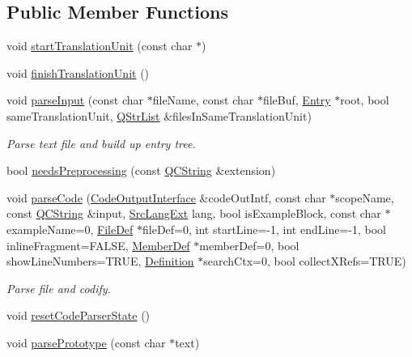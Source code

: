 \subsection*{Public Member Functions}
\begin{DoxyCompactItemize}
\item 
void \mbox{\hyperlink{class_tcl_language_scanner_a60ddc698e1b483f71f4ce4ca4bffb512}{start\+Translation\+Unit}} (const char $\ast$)
\item 
void \mbox{\hyperlink{class_tcl_language_scanner_a187804b0bf0a0043bad0f1a752224909}{finish\+Translation\+Unit}} ()
\item 
\mbox{\label{class_tcl_language_scanner_a0c1673d0753d4fa415de90aa7d875e0e}} 
void \mbox{\hyperlink{class_tcl_language_scanner_a0c1673d0753d4fa415de90aa7d875e0e}{parse\+Input}} (const char $\ast$file\+Name, const char $\ast$file\+Buf, \mbox{\hyperlink{class_entry}{Entry}} $\ast$root, bool same\+Translation\+Unit, \mbox{\hyperlink{class_q_str_list}{Q\+Str\+List}} \&files\+In\+Same\+Translation\+Unit)
\begin{DoxyCompactList}\small\item\em Parse text file and build up entry tree. \end{DoxyCompactList}\item 
bool \mbox{\hyperlink{class_tcl_language_scanner_ab3a4ec9c04dbcf8bb75cd1552c774f5e}{needs\+Preprocessing}} (const \mbox{\hyperlink{class_q_c_string}{Q\+C\+String}} \&extension)
\item 
\mbox{\label{class_tcl_language_scanner_a25f39e49124e2201c4a12d7ff1247b30}} 
void \mbox{\hyperlink{class_tcl_language_scanner_a25f39e49124e2201c4a12d7ff1247b30}{parse\+Code}} (\mbox{\hyperlink{class_code_output_interface}{Code\+Output\+Interface}} \&code\+Out\+Intf, const char $\ast$scope\+Name, const \mbox{\hyperlink{class_q_c_string}{Q\+C\+String}} \&input, \mbox{\hyperlink{types_8h_a9974623ce72fc23df5d64426b9178bf2}{Src\+Lang\+Ext}} lang, bool is\+Example\+Block, const char $\ast$example\+Name=0, \mbox{\hyperlink{class_file_def}{File\+Def}} $\ast$file\+Def=0, int start\+Line=-\/1, int end\+Line=-\/1, bool inline\+Fragment=F\+A\+L\+SE, \mbox{\hyperlink{class_member_def}{Member\+Def}} $\ast$member\+Def=0, bool show\+Line\+Numbers=T\+R\+UE, \mbox{\hyperlink{class_definition}{Definition}} $\ast$search\+Ctx=0, bool collect\+X\+Refs=T\+R\+UE)
\begin{DoxyCompactList}\small\item\em Parse file and codify. \end{DoxyCompactList}\item 
void \mbox{\hyperlink{class_tcl_language_scanner_abb80856bb640644a4eaeeac91a427b45}{reset\+Code\+Parser\+State}} ()
\item 
void \mbox{\hyperlink{class_tcl_language_scanner_ad39889d754478f3bd641c92c3fdb2247}{parse\+Prototype}} (const char $\ast$text)
\end{DoxyCompactItemize}


